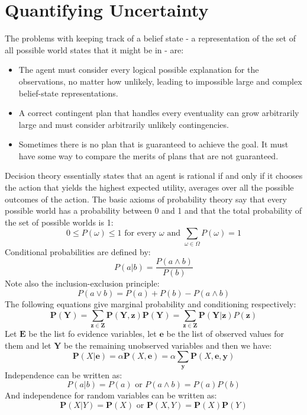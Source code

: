 \documentclass[twoside]{article}
\begin{document}
\section{Quantifying Uncertainty}
The problems with keeping track of a belief state - a representation of the set
of all possible world states that it might be in - are:
\begin{itemize}
        \item The agent must consider every logical possible explanation for
        the observations, no matter how unlikely, leading to impossible large
        and complex belief-state representations.
        \item A correct contingent plan that handles every eventuality can 
        grow arbitrarily large and must consider arbitrarily unlikely 
        contingencies.
        \item Sometimes there is no plan that is guaranteed to achieve the 
        goal. It must have some way to compare the merits of plans that are 
        not guaranteed.
\end{itemize}
Decision theory essentially states that an agent is rational if and only if it 
chooses the action that yields the highest expected utility, averages over all
the possible outcomes of the action. The basic axioms of probability theory say
that every possible world has a probability between 0 and 1 and that the total
probability of the set of possible worlds is 1:
\begin{equation}
        0 \leq P(\omega) \leq 1 \text{ for every } \omega \text{ and } \sum_{\omega \in \Omega} P(\omega) = 1
\end{equation}
Conditional probabilities are defined by:
\begin{equation}
        P(a|b) = \frac{P(a \land b)}{P(b)}
\end{equation}
Note also the inclusion-exclusion principle:
\begin{equation}
        P(a \lor b) = P(a) + P(b) - P(a \land b)
\end{equation}
The following equations give marginal probability and conditioning respectively:
\begin{equation}
        \mathbf{P(Y) = \sum_{z \in Z} P(Y, z)}
        \mathbf{P(Y) = \sum_{z \in Z}P(Y|z)}P(\mathbf{z})
\end{equation}
Let \(\mathbf{E}\) be the list fo evidence variables, let \(\mathbf{e}\) be 
the list of observed values for them and let \(\mathbf{Y}\) be the remaining
unobserved variables and then we have:
\begin{equation}
        \mathbf P(X|\mathbf e) = \alpha \mathbf P(X, \mathbf e) = \alpha \sum_\mathbf y \mathbf P(X, \mathbf e, \mathbf y)
\end{equation}
Independence can be written as:
\begin{equation}
        P(a|b) = P(a) \text{ or } P(a \land b) = P(a)P(b)
\end{equation}
And independence for random variables can be written as:
\begin{equation}
        \mathbf P(X|Y) = \mathbf P(X) \text{ or } \mathbf P(X, Y) = \mathbf P(X) \mathbf P(Y)
\end{equation}
\end{document}

